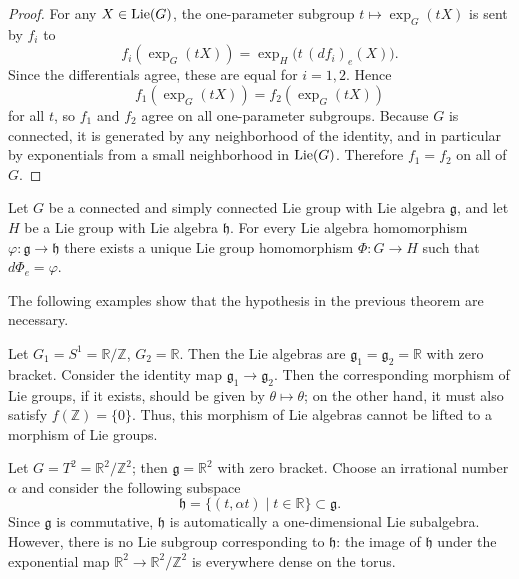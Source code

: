 \documentclass[12pt]{article}
\begin{document}
\begin{proof}
    For any $X\in \operatorname{Lie}(G)$, the one-parameter subgroup $t\mapsto \exp_G(tX)$ is sent by $f_i$ to
    \[
        f_i(\exp_G(tX))=\exp_H\bigl(t\,(df_i)_e(X)\bigr).
    \]
    Since the differentials agree, these are equal for $i=1,2$. Hence
    \[
        f_1(\exp_G(tX))=f_2(\exp_G(tX))
    \]
    for all $t$, so $f_1$ and $f_2$ agree on all one-parameter subgroups. Because $G$ is connected, it is generated by any neighborhood of the identity, and in particular by exponentials from a small neighborhood in $\operatorname{Lie}(G)$. Therefore $f_1=f_2$ on all of $G$.
\end{proof}

\begin{theorem}
    Let \(G\) be a connected and simply connected Lie group with Lie algebra \(\mathfrak g\), and let \(H\) be a Lie group with Lie algebra \(\mathfrak h\).
    For every Lie algebra homomorphism $
        \varphi:\mathfrak g\to\mathfrak h$
    there exists a unique Lie group homomorphism
    $\Phi:G\to H$ such that $d\Phi_e = \varphi$.
\end{theorem}

The following examples show that the hypothesis in the previous theorem are necessary. \begin{example}
    Let $G_1=S^1=\mathbb R/\mathbb Z$, $G_2=\mathbb R$. Then the Lie algebras are
    $\mathfrak g_1=\mathfrak g_2=\mathbb R$ with zero bracket. Consider the identity map $\mathfrak g_1\to \mathfrak g_2$. Then the corresponding
    morphism of Lie groups, if it exists, should be given by $\theta\mapsto \theta$; on the other hand, it must also satisfy $f(\mathbb Z)=\{0\}$. Thus, this morphism of Lie algebras cannot be lifted to a morphism of Lie groups.
\end{example}

\begin{example}
    Let $G=T^2=\mathbb R^2/\mathbb Z^2$; then $\mathfrak g=\mathbb R^2$ with zero
    bracket. Choose an irrational number $\alpha$ and consider the following subspace
    \[
        \mathfrak h=\{(t,\alpha t)\mid t\in\mathbb R\}\subset \mathfrak g.
    \]
    Since $\mathfrak g$ is commutative, $\mathfrak h$ is automatically a
    one-dimensional Lie subalgebra. However, there is no Lie subgroup corresponding
    to $\mathfrak h$: the image of $\mathfrak h$ under the exponential map
    $\mathbb R^2\to \mathbb R^2/\mathbb Z^2$ is everywhere dense on the torus.
\end{example}
\end{document}
